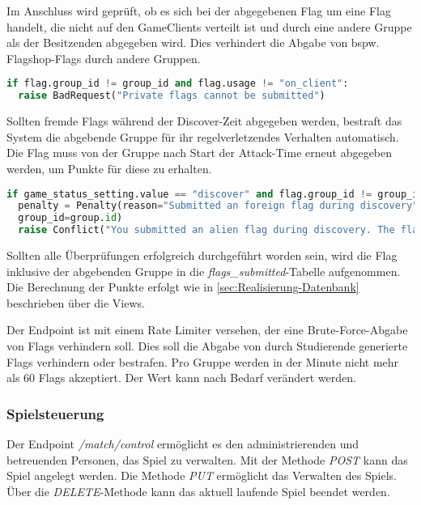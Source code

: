 Im Anschluss wird geprüft, ob es sich bei der abgegebenen Flag um eine Flag handelt, die nicht auf den GameClients verteilt ist und durch eine andere Gruppe als der Besitzenden abgegeben wird. Dies verhindert die Abgabe von bspw. Flagshop-Flags durch andere Gruppen. 

\begin{lstlisting}[language=Python, frame=single, caption={GIS Abgabe privater Flags verhindern}, captionpos=b, label={lst:gis-prevent-submitting-private-flags}]
if flag.group_id != group_id and flag.usage != "on_client":
  raise BadRequest("Private flags cannot be submitted")
\end{lstlisting}

Sollten fremde Flags während der Discover-Zeit abgegeben werden, bestraft das System die abgebende Gruppe für ihr regelverletzendes Verhalten automatisch. Die Flag muss von der Gruppe nach Start der Attack-Time erneut abgegeben werden, um Punkte für diese zu \linebreak erhalten.

\begin{lstlisting}[language=Python, frame=single, caption={GIS Strafe für das Abgeben fremder Flags}, captionpos=b, label={lst:gis-flag-penatly}]
if game_status_setting.value == "discover" and flag.group_id != group_id:
  penalty = Penalty(reason="Submitted an foreign flag during discovery", points=penalty_points,
  group_id=group.id)
  raise Conflict("You submitted an alien flag during discovery. The flag is not accepted. You'll be punished.")
\end{lstlisting}

Sollten alle Überprüfungen erfolgreich durchgeführt worden sein, wird die Flag inklusive der abgebenden Gruppe in die \textit{flags\_submitted}-Tabelle aufgenommen. Die Berechnung der Punkte erfolgt wie in \autoref{sec:Realisierung-Datenbank} beschrieben über die Views.

Der Endpoint ist mit einem Rate Limiter versehen, der eine Brute-Force-Abgabe von Flags verhindern soll. Dies soll die Abgabe von durch Studierende generierte Flags verhindern oder bestrafen. Pro Gruppe werden in der Minute nicht mehr als 60 Flags akzeptiert. Der Wert kann nach Bedarf verändert werden.

\subsubsection{Spielsteuerung}
Der Endpoint \textit{/match/control} ermöglicht es den administrierenden und betreuenden Personen, das Spiel zu verwalten. Mit der Methode \textit{POST} kann das Spiel angelegt werden. \linebreak Die Methode \textit{PUT} ermöglicht das Verwalten des Spiels. Über die \textit{DELETE}-Methode kann das aktuell laufende Spiel beendet werden.

